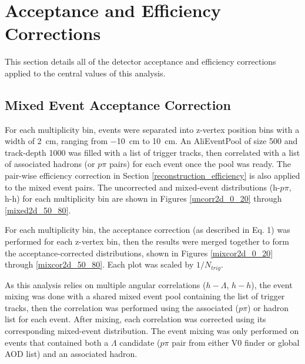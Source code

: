 \documentclass[ALICE,manyauthors]{ALICE_analysis_notes}
\begin{document}
\clearpage



\section{Acceptance and Efficiency Corrections}
\label{efficiency_acceptance}
This section details all of the detector acceptance and efficiency corrections applied to the central values of this analysis.

\subsection{Mixed Event Acceptance Correction}
\label{mixed_event_correction}

For each multiplicity bin, events were separated into z-vertex position bins with a width of \SI{2}{cm}, ranging from \SI{-10}{cm} to \SI{10}{cm}. An AliEventPool of size 500 and track-depth 1000 was filled with a list of trigger tracks, then correlated with a list of associated hadrons (or $p\pi$ pairs) for each event once the pool was ready. The pair-wise efficiency correction in Section \ref{reconstruction_efficiency} is also applied to the mixed event pairs. The uncorrected and mixed-event distributions (h-$p\pi$, h-h) for each multiplicity bin are shown in Figures \ref{uncorr2d_0_20} through \ref{mixed2d_50_80}.

For each multiplicity bin, the acceptance correction (as described in Eq. 1) was performed for each z-vertex bin, then the results were merged together to form the acceptance-corrected distributions, shown in Figures \ref{mixcor2d_0_20} through \ref{mixcor2d_50_80}. Each plot was scaled by $1/N_{trig}$.

As this analysis relies on multiple angular correlations ($h-\Lambda$, $h-h$), the event mixing was done with a shared mixed event pool containing the list of trigger tracks, then the correlation was performed using the associated ($p\pi$) or hadron list for each event. After mixing, each correlation was corrected using its corresponding mixed-event distribution. The event mixing was only performed on events that contained both a $\Lambda$ candidate ($p\pi$ pair from either V0 finder or global AOD list) and an associated hadron.
\end{document}
